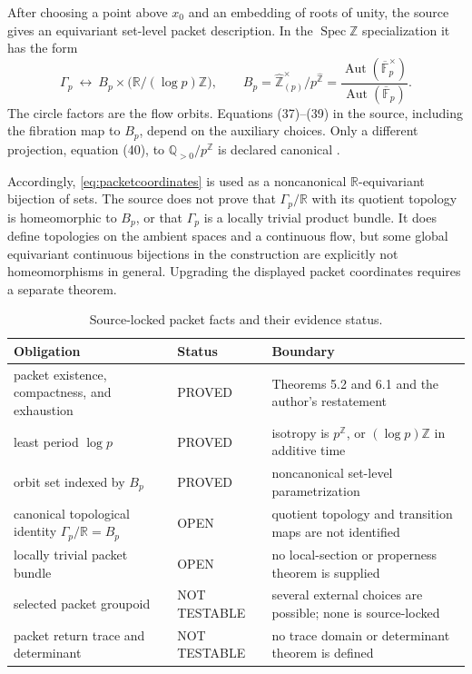 \documentclass[11pt]{article}
\theoremstyle{definition}
\theoremstyle{remark}
\newcommand{\R}{\mathbb{R}}
\newcommand{\Q}{\mathbb{Q}}
\newcommand{\Z}{\mathbb{Z}}
\newcommand{\Spec}{\operatorname{Spec}}
\newcommand{\proved}{\textsf{PROVED}}
\newcommand{\openclaim}{\textsf{OPEN}}
\newcommand{\nottest}{\textsf{NOT TESTABLE}}
\begin{document}
After choosing a point above \(x_0\) and an embedding of roots of unity, the
source gives an equivariant set-level packet description.  In the
\(\Spec\Z\) specialization it has the form
\begin{equation}
 \Gamma_p\ \longleftrightarrow\
 B_p\times\bigl(\R/(\log p)\Z\bigr),
 \qquad
 B_p=
 \widehat{\Z}_{(p)}^\times/p^{\widehat{\Z}}
 =
 \frac{\operatorname{Aut}(\overline{\mathbb F}_p^\times)}
 {\operatorname{Aut}(\overline{\mathbb F}_p)}.
 \label{eq:packetcoordinates}
\end{equation}
The circle factors are the flow orbits.  Equations (37)--(39) in the source,
including the fibration map to \(B_p\), depend on the auxiliary choices.  Only
a different projection, equation (40), to
\(\Q_{>0}/p^\Z\) is declared canonical \citep{Deninger2026}.

Accordingly, \eqref{eq:packetcoordinates} is used as a noncanonical
\(\R\)-equivariant bijection of sets.  The source does not prove that
\(\Gamma_p/\R\) with its quotient topology is homeomorphic to \(B_p\), or
that \(\Gamma_p\) is a locally trivial product bundle.  It does define
topologies on the ambient spaces and a continuous flow, but some global
equivariant continuous bijections in the construction are explicitly not
homeomorphisms in general.  Upgrading the displayed packet coordinates
requires a separate theorem.

\begin{table}[ht]
\centering
\caption{Source-locked packet facts and their evidence status.}
\label{tab:sourcefacts}
\small
\begin{tabularx}{\textwidth}{p{}p{}X}
\toprule
Obligation & Status & Boundary\\
\midrule
packet existence, compactness, and exhaustion & \proved & Theorems 5.2 and 6.1 and the author's restatement\\
least period \(\log p\) & \proved & isotropy is \(p^\Z\), or \((\log p)\Z\) in additive time\\
orbit set indexed by \(B_p\) & \proved & noncanonical set-level parametrization\\
canonical topological identity \(\Gamma_p/\R=B_p\) & \openclaim & quotient topology and transition maps are not identified\\
locally trivial packet bundle & \openclaim & no local-section or properness theorem is supplied\\
selected packet groupoid & \nottest & several external choices are possible; none is source-locked\\
packet return trace and determinant & \nottest & no trace domain or determinant theorem is defined\\
\bottomrule
\end{tabularx}
\end{table}
\end{document}
